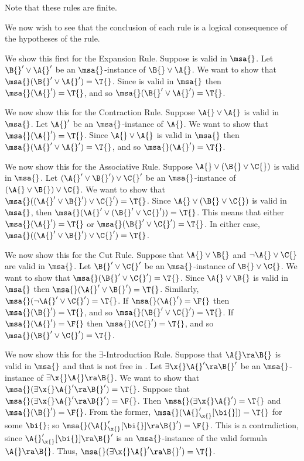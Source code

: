 \begin{remark}
    Note that these rules are finite.
\end{remark}

We now wish to see that the conclusion of each rule is a logical consequence of the hypotheses of the rule.

We show this first for the Expansion Rule.
Suppose \A{} is valid in $\msa{}$.
Let $\B{}' \vee \A{}'$ be an $\msa{}$-instance of $\B{} \vee \A{}$.
We want to show that $\msa{} (\B{}' \vee \A{}') = \T{}$.
Since \A{} is valid in $\msa{}$ then $\msa{} (\A{}') = \T{}$, and so $\msa{} (\B{}' \vee \A{}') = \T{}$.

We now show this for the Contraction Rule.
Suppose $\A{} \vee \A{}$ is valid in $\msa{}$.
Let $\A{}'$ be an $\msa{}$-instance of $\A{}$.
We want to show that $\msa{} (\A{}') = \T{}$.
Since $\A{} \vee \A{}$ is valid in $\msa{}$ then $\msa{} (\A{}' \vee \A{}') = \T{}$, and so $\msa{} (\A{}') = \T{}$.

We now show this for the Associative Rule.
Suppose $\A{} \vee (\B{} \vee \C{})$ is valid in $\msa{}$.
Let $(\A{}' \vee \B{}') \vee \C{}'$ be an $\msa{}$-instance of $(\A{} \vee \B{}) \vee \C{}$.
We want to show that $\msa{} ((\A{}' \vee \B{}') \vee \C{}') = \T{}$.
Since $\A{} \vee (\B{} \vee \C{})$ is valid in $\msa{}$, then $\msa{} (\A{}' \vee (\B{}' \vee \C{}')) = \T{}$.
This means that either $\msa{} (\A{}') = \T{}$ or $\msa{} (\B{}' \vee \C{}') = \T{}$.
In either case, $\msa{} ((\A{}' \vee \B{}') \vee \C{}') = \T{}$.

We now show this for the Cut Rule.
Suppose that $\A{} \vee \B{}$ and $\neg \A{} \vee \C{}$ are valid in $\msa{}$.
Let $\B{}' \vee \C{}'$ be an $\msa{}$-instance of $\B{} \vee \C{}$.
We want to show that $\msa{} (\B{}' \vee \C{}') = \T{}$.
Since $\A{} \vee \B{}$ is valid in $\msa{}$ then $\msa{} (\A{}' \vee \B{}') = \T{}$. Similarly, $\msa{} (\neg \A{}' \vee \C{}') = \T{}$.
If $\msa{} (\A{}') = \F{}$ then $\msa{} (\B{}') = \T{}$, and so $\msa{} (\B{}' \vee \C{}') = \T{}$.
If $\msa{} (\A{}') = \F{}$ then $\msa{} (\C{}') = \T{}$, and so $\msa{} (\B{}' \vee \C{}') = \T{}$.

We now show this for the $\exists$-Introduction Rule.
Suppose that $\A{} \ra \B{}$ is valid in $\msa{}$ and that \x{} is not free in \B{}.
Let $\exists \x{} \A{}' \ra \B{}'$ be an $\msa{}$-instance of $\exists \x{} \A{} \ra \B{}$.
We want to show that $\msa{} (\exists \x{} \A{}' \ra \B{}') = \T{}$.
Suppose that $\msa{} (\exists \x{} \A{}' \ra \B{}') = \F{}$.
Then $\msa{} (\exists \x{} \A{}') = \T{}$ and $\msa{} (\B{}') = \F{}$.
From the former, $\msa{} (\A{}'_\x{} [\bi{}]) = \T{}$ for some $\bi{}$;
so $\msa{} (\A{}'_\x{} [\bi{}] \ra \B{}') = \F{}$.
This is a contradiction, since $\A{}'_\x{} [\bi{}] \ra \B{}'$ is an $\msa{}$-instance of the valid formula $\A{} \ra \B{}$.
Thus, $\msa{} (\exists \x{} \A{}' \ra \B{}') = \T{}$.

